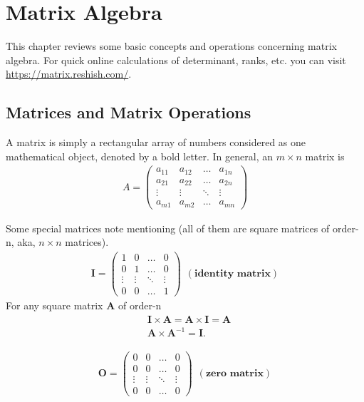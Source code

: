 \documentclass[10pt,a4paper]{book}
\theoremstyle{definition}\newtheorem{definition}{Definition}
\theoremstyle{definition}\newtheorem{fact}{Fact}
\theoremstyle{definition}\newtheorem{ex}{Ex.}
\theoremstyle{definition}\newtheorem{project}{Project}
\theoremstyle{definition}\newtheorem{problem}{Problem}
\theoremstyle{definition}\newtheorem{example}{Example}
\numberwithin{theorem}{chapter}
\numberwithin{corollary}{chapter}
\numberwithin{assumption}{chapter}
\numberwithin{definition}{chapter}
\numberwithin{prop}{chapter}
\numberwithin{notation}{chapter}
\numberwithin{problem}{chapter}
\numberwithin{example}{chapter}
\numberwithin{fact}{chapter}
\numberwithin{ex}{chapter}
\def\A{\mathbf A}
\def\O{\mathbf O}
\def\I{\mathbf I}
\begin{document}
		\chapter{Matrix Algebra}
	This chapter reviews some basic concepts and operations concerning matrix algebra. For quick online calculations of determinant, ranks, etc. you can visit \href{https://matrix.reshish.com/}{https://matrix.reshish.com/}.
	
	\section{Matrices and Matrix Operations}
	A matrix is simply a rectangular array of numbers considered as one mathematical object, denoted by a bold letter. In general, an $m \times n$ matrix is
	\begin{align*}
		A = 
		\begin{pmatrix}
			a_{11} & a_{12} & \dots  & a_{1n} \\
			a_{21} & a_{22} & \dots  & a_{2n} \\
			\vdots & \vdots & \ddots & \vdots \\
			a_{m1} & a_{m2} & \dots  & a_{mn} 
		\end{pmatrix}
	\end{align*}
	
	Some special matrices note mentioning (all of them are square matrices of order-n, aka, $n\times n$ matrices).
	\begin{align*}
		\I = 
		\begin{pmatrix}
			1      & 0      & \dots  & 0      \\
			0      & 1      & \dots  & 0      \\
			\vdots & \vdots & \ddots & \vdots \\
			0      & 0      & \dots  & 1      
		\end{pmatrix} \ \ (\textbf{identity matrix})
	\end{align*}
	For any square matrix $\A$ of order-n 
	\begin{align*}
		& \I \times \A = \A \times \I = \A \\
		& \A \times \A^{-1} = \I.          
	\end{align*}
	
	
	\begin{align*}
		\O = 
		\begin{pmatrix}
			0      & 0      & \dots  & 0      \\
			0      & 0      & \dots  & 0      \\
			\vdots & \vdots & \ddots & \vdots \\
			0      & 0      & \dots  & 0      
		\end{pmatrix} \ \ (\textbf{zero matrix})
	\end{align*}
	
\end{document}
